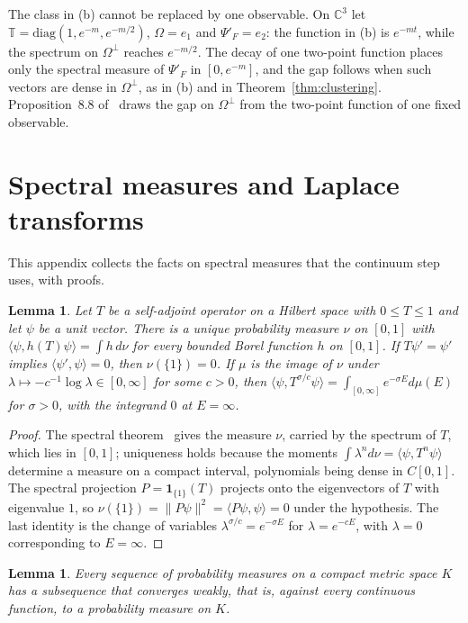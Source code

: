 \documentclass[aps,prd,twocolumn,superscriptaddress,nofootinbib,longbibliography,floatfix,amsmath,amssymb,10pt]{revtex4-2}
\newtheorem{lemma}[theorem]{Lemma}
\theoremstyle{definition}
\theoremstyle{remark}
\newcommand{\C}{\mathbb{C}}
\newcommand{\ip}[2]{\langle #1,#2\rangle}
\begin{document}
The class in (b) cannot be replaced by one observable. On $\C^3$ let
$\mathbb T=\mathrm{diag}(1,e^{-m},e^{-m/2})$, $\Omega=e_1$ and $\Psi'_F=e_2$:
the function in (b) is $e^{-mt}$, while the spectrum on $\Omega^\perp$ reaches
$e^{-m/2}$. The decay of one two-point function places only the spectral
measure of $\Psi'_F$ in $[0,e^{-m}]$, and the gap follows when such vectors
are dense in $\Omega^\perp$, as in (b) and in Theorem~\ref{thm:clustering}.
Proposition~8.8 of~\cite{FaS26} draws the gap on $\Omega^\perp$ from the
two-point function of one fixed observable.

\section{Spectral measures and Laplace transforms}\label{app:spectral}

This appendix collects the facts on spectral measures that the continuum
step uses, with proofs.

\begin{lemma}\label{lem:spectralmeasure}
Let $T$ be a self-adjoint operator on a Hilbert space with $0\le T\le1$ and
let $\psi$ be a unit vector. There is a unique probability measure $\nu$ on
$[0,1]$ with $\ip\psi{h(T)\psi}=\int h\,d\nu$ for every bounded Borel
function $h$ on $[0,1]$. If $T\psi'=\psi'$ implies $\ip{\psi'}\psi=0$, then
$\nu(\{1\})=0$. If $\mu$ is the image of $\nu$ under
$\lambda\mapsto-c^{-1}\log\lambda\in[0,\infty]$ for some $c>0$, then
$\ip\psi{T^{\sigma/c}\psi}=\int_{[0,\infty]}e^{-\sigma E}d\mu(E)$ for
$\sigma>0$, with the integrand $0$ at $E=\infty$.
\end{lemma}

\begin{proof}
The spectral theorem~\cite[Sec.~VII.2]{RS80} gives the measure $\nu$,
carried by the spectrum of $T$, which lies in $[0,1]$; uniqueness
holds because the moments $\int\lambda^n d\nu=\ip\psi{T^n\psi}$ determine a
measure on a compact interval, polynomials being dense in $C[0,1]$. The
spectral projection $P=\mathbf 1_{\{1\}}(T)$ projects onto the eigenvectors
of $T$ with eigenvalue $1$, so $\nu(\{1\})=\|P\psi\|^2=\ip{P\psi}\psi=0$
under the hypothesis. The last identity is the change of variables
$\lambda^{\sigma/c}=e^{-\sigma E}$ for $\lambda=e^{-cE}$, with $\lambda=0$
corresponding to $E=\infty$.
\end{proof}

\begin{lemma}\label{lem:helly}
Every sequence of probability measures on a compact metric space $K$ has a
subsequence that converges weakly, that is, against every continuous
function, to a probability measure on $K$.
\end{lemma}
\end{document}
